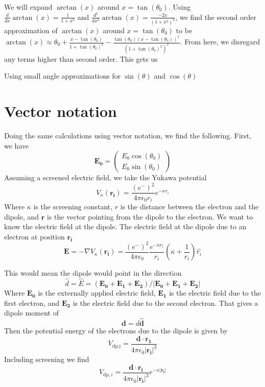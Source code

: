 We will expand $\arctan(x)$ around $x=\tan(\theta_0)$. Using $\frac{d}{dx} \arctan(x) = \frac{1}{1+x^2}$ and $\frac{d^2}{dx^2} \arctan(x) = \frac{-2x}{(1+x^2)^2}$, we find the second order approximation of $\arctan(x)$ around $x=\tan(\theta_0)$ to be $\arctan(x) \approx \theta_0 + \frac{x-\tan(\theta_0)}{1+\tan(\theta_0)^2} - \frac{\tan(\theta_0) (x-\tan(\theta_0))^2}{(1+\tan(\theta_0)^2)^2}$. From here, we disregard any terms higher than second order. This gets us

Using small angle approximations for $\sin(\theta)$ and $\cos(\theta)$

\section{Vector notation}
\label{section: Vector Notation}
Doing the same calculations using vector notation, we find the following. 
First, we have 
\begin{equation}
    \mathbf{E_0} = 
    \begin{pmatrix*}
        E_0 \cos(\theta_0) \\
        E_0 \sin(\theta_0)
    \end{pmatrix*}
\end{equation}
Assuming a screened electric field, we take the Yukawa potential 
\begin{equation}
    V_\kappa (\mathbf{r_i}) = \frac{(e^-)^2}{4 \pi \epsilon_0 r_i} e^{-\kappa r_i} 
\end{equation}
Where $\kappa$ is the screening constant, $r$ is the distance between the electron and the dipole, and $\mathbf{r}$ is the vector pointing from the dipole to the electron.
We want to know the electric field at the dipole. The electric field at the dipole due to an electron at position $\mathbf{r_i}$
\begin{equation}
    \mathbf{E} = - \nabla V_\kappa (\mathbf{r_i}) = 
    \frac{(e^-)^2}{4 \pi \epsilon_0} \frac{e^{-\kappa r_i}}{r_i} \left( \kappa + \frac{1}{r_i} \right) \hat{r_i}
\end{equation}

This would mean the dipole would point in the direction 
\begin{equation}
    \hat{d} = \hat{E} = 
    (\mathbf{E_0 + E_1 + E_2} ) / | \mathbf{E_0 + E_1 + E_2} |
\end{equation}
Where $\mathbf{E_0}$ is the externally applied electric field, $\mathbf{E_1}$ is the electric field due to the first electron, and $\mathbf{E_2}$ is the electric field due to the second electron. That gives a dipole moment of 
\begin{equation}
    \mathbf{d} = 
    d \hat{\mathbf{d}}
\end{equation}
Then the potential energy of the electrons due to the dipole is given by
\begin{equation}
    V_{\text{dp,i}} = 
    \frac{\mathbf{d} \cdot \mathbf{r_1}}{4 \pi \epsilon_0 |\mathbf{r_i}|^3}
\end{equation}
Including screening we find
\begin{equation}
    V_{\text{dp},i} = 
    \frac{\mathbf{d} \cdot \mathbf{r_i}}{4 \pi \epsilon_0 |\mathbf{r_i}|^3}
    e ^{-\kappa |\mathbf{r_i}|}
\end{equation}



